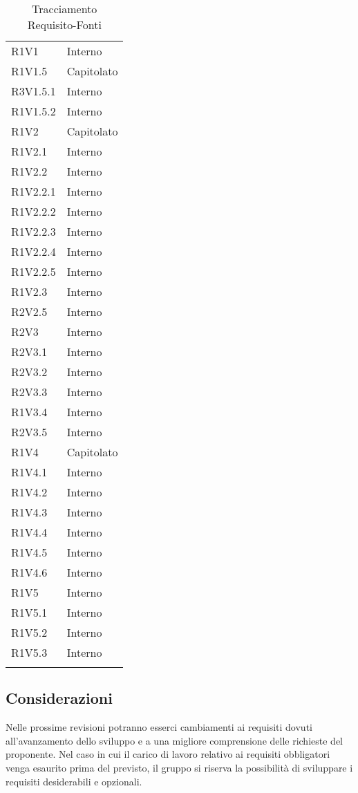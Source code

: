 \begin{longtable} {
			>{\centering}p{28mm}  
			>{}p{20mm}
		}
		R1V1 & Interno \TBstrut \\ [2mm]
		R1V1.5 & Capitolato \TBstrut \\ [2mm]
		R3V1.5.1 & Interno \TBstrut \\ [2mm]
		R1V1.5.2 & Interno \TBstrut \\ [2mm]
		R1V2 & Capitolato \TBstrut \\ [2mm]
		R1V2.1 & Interno \TBstrut \\ [2mm]
		R1V2.2 & Interno \TBstrut \\ [2mm]
		R1V2.2.1 & Interno \TBstrut \\ [2mm]
		R1V2.2.2 & Interno \TBstrut \\ [2mm]
		R1V2.2.3 & Interno \TBstrut \\ [2mm]
		R1V2.2.4 & Interno \TBstrut \\ [2mm]
		R1V2.2.5 & Interno \TBstrut \\ [2mm]
		R1V2.3 & Interno \TBstrut \\ [2mm]
		R2V2.5 & Interno \TBstrut \\ [2mm]
		R2V3 & Interno \TBstrut \\ [2mm]
		R2V3.1 & Interno \TBstrut \\ [2mm]
		R2V3.2 & Interno \TBstrut \\ [2mm]
		R2V3.3 & Interno \TBstrut \\ [2mm]
		R1V3.4 & Interno \TBstrut \\ [2mm]
		R2V3.5 & Interno \TBstrut \\ [2mm]
		R1V4 & Capitolato \TBstrut \\ [2mm]
		R1V4.1 & Interno \TBstrut \\ [2mm]
		R1V4.2 & Interno \TBstrut \\ [2mm]
		R1V4.3 & Interno \TBstrut \\ [2mm]
		R1V4.4 & Interno \TBstrut \\ [2mm]
		R1V4.5 & Interno \TBstrut \\ [2mm]
		R1V4.6 & Interno \TBstrut \\ [2mm]
		R1V5 & Interno \TBstrut \\ [2mm]
		R1V5.1 & Interno \TBstrut \\ [2mm]
		R1V5.2 & Interno \TBstrut \\ [2mm]
		R1V5.3 & Interno \TBstrut \\ [2mm]
		\rowcolor{white}
		\caption{Tracciamento Requisito-Fonti}
	\end{longtable}
	\subsection{Considerazioni}
	Nelle prossime revisioni potranno esserci cambiamenti ai requisiti dovuti all'avanzamento dello sviluppo e a una migliore comprensione delle richieste del proponente. Nel caso in cui il carico di lavoro relativo ai requisiti obbligatori venga esaurito prima del previsto, il gruppo si riserva la possibilità di sviluppare i requisiti desiderabili e opzionali.
